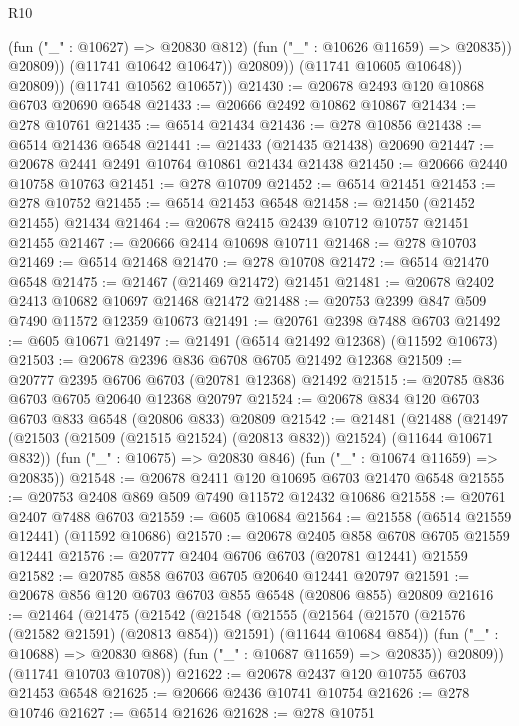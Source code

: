 \begin{lexlean}{R10}
\begin{coremodule}
{{{{{{{{{{{{{{{{{{{{{{{{{{{{{{{{{{{{{{{{{{{{{{{{{{{{{{{{{{{{{{{{{{{{{{{{{{{{{{{{{{{{                        (fun ("_" : @10627) => @20830 @812)
                        (fun ("_" : @10626 @11659) => @20835))
                      @20809))
                  (@11741 @10642 @10647))
                @20809))
            (@11741 @10605 @10648))
          @20809))
      (@11741 @10562 @10657))
@21430 := @20678 @2493 @120 @10868 @6703 @20690 @6548
@21433 := @20666 @2492 @10862 @10867
@21434 := @278 @10761
@21435 := @6514 @21434
@21436 := @278 @10856
@21438 := @6514 @21436 @6548
@21441 := @21433 (@21435 @21438) @20690
@21447 := @20678 @2441 @2491 @10764 @10861 @21434 @21438
@21450 := @20666 @2440 @10758 @10763
@21451 := @278 @10709
@21452 := @6514 @21451
@21453 := @278 @10752
@21455 := @6514 @21453 @6548
@21458 := @21450 (@21452 @21455) @21434
@21464 := @20678 @2415 @2439 @10712 @10757 @21451 @21455
@21467 := @20666 @2414 @10698 @10711
@21468 := @278 @10703
@21469 := @6514 @21468
@21470 := @278 @10708
@21472 := @6514 @21470 @6548
@21475 := @21467 (@21469 @21472) @21451
@21481 := @20678 @2402 @2413 @10682 @10697 @21468 @21472
@21488 := @20753 @2399 @847 @509 @7490 @11572 @12359 @10673
@21491 := @20761 @2398 @7488 @6703
@21492 := @605 @10671
@21497 := @21491 (@6514 @21492 @12368) (@11592 @10673)
@21503 := @20678 @2396 @836 @6708 @6705 @21492 @12368
@21509 := @20777 @2395 @6706 @6703 (@20781 @12368) @21492
@21515 := @20785 @836 @6703 @6705 @20640 @12368 @20797
@21524 := @20678 @834 @120 @6703 @6703 @833 @6548 (@20806 @833) @20809
@21542 := @21481
    (@21488
      (@21497 (@21503 (@21509 (@21515 @21524) (@20813 @832)) @21524) (@11644 @10671 @832))
      (fun ("_" : @10675) => @20830 @846)
      (fun ("_" : @10674 @11659) => @20835))
@21548 := @20678 @2411 @120 @10695 @6703 @21470 @6548
@21555 := @20753 @2408 @869 @509 @7490 @11572 @12432 @10686
@21558 := @20761 @2407 @7488 @6703
@21559 := @605 @10684
@21564 := @21558 (@6514 @21559 @12441) (@11592 @10686)
@21570 := @20678 @2405 @858 @6708 @6705 @21559 @12441
@21576 := @20777 @2404 @6706 @6703 (@20781 @12441) @21559
@21582 := @20785 @858 @6703 @6705 @20640 @12441 @20797
@21591 := @20678 @856 @120 @6703 @6703 @855 @6548 (@20806 @855) @20809
@21616 := @21464
    (@21475
      (@21542
        (@21548
          (@21555
            (@21564 (@21570 (@21576 (@21582 @21591) (@20813 @854)) @21591) (@11644 @10684 @854))
            (fun ("_" : @10688) => @20830 @868)
            (fun ("_" : @10687 @11659) => @20835))
          @20809))
      (@11741 @10703 @10708))
@21622 := @20678 @2437 @120 @10755 @6703 @21453 @6548
@21625 := @20666 @2436 @10741 @10754
@21626 := @278 @10746
@21627 := @6514 @21626
@21628 := @278 @10751
}}}}}}}}}}}}}}}}}}}}}}}}}}}}}}}}}}}}}}}}}}}}}}}}}}}}}}}}}}}}}}}}}}}}}}}}}}}}}}}}}}}}
\end{coremodule}
\end{lexlean}
